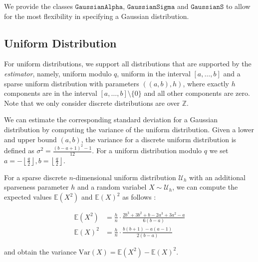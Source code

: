 We provide the classes $\texttt{GaussianAlpha}$, $\texttt{GaussianSigma}$ and $\texttt{GaussianS}$ to allow for the most flexibility in specifying a Gaussian distribution.

\subsection{Uniform Distribution}
For uniform distributions, we support all distributions that are supported by the \textit{estimator}, namely, uniform modulo $q$, uniform in the interval $[a,\dots,b]$ and a sparse uniform distribution with parameters $((a,b), h)$, where exactly $h$ components are in the interval $[a,\dots,b] \setminus \{0\}$ and all other components are zero. Note that we only consider discrete distributions are over $\mathbb{Z}$.

We can estimate the corresponding standard deviation for a Gaussian distribution by computing the variance of the uniform distribution. Given a lower and upper bound $(a, b)$, the variance for a discrete uniform distribution is defined as $\sigma^2 = \frac{(b - a + 1)^2 - 1}{12}$. For a uniform distribution modulo $q$ we set $a = -\left\lfloor \frac{q}{2} \right\rfloor, b = \left\lfloor \frac{q}{2} \right\rfloor$.

For a sparse discrete $n$-dimensional uniform distribution $\mathcal{U}_h$ with an additional sparseness parameter $h$ and a random variabel $X \sim \mathcal{U}_h$, we can compute the expected values $\mathbb{E}(X^2)$ and $\mathbb{E}(X)^2$ as follows \cite{APS15}:

\begin{align}
    \mathbb{E}(X^2) & = \frac{h}{n} \cdot \frac{2b^3 + 3b^2 + b - 2a^3 + 3a^2 - a}{6(b - a)} \\
    \mathbb{E}(X)^2 & = \frac{h}{n} \cdot \frac{b (b + 1) - a(a - 1)}{2(b - a)}
\end{align}

and obtain the variance $\text{Var}(X) = \mathbb{E}(X^2) - \mathbb{E}(X)^2$.



